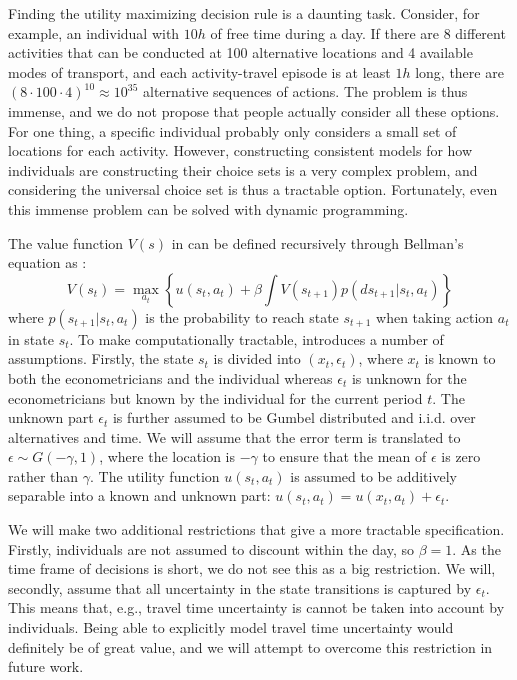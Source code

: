 Finding the utility maximizing decision rule is a daunting task. Consider, for example, an individual with $10\unit{h}$ of free time during a day. If there are 8 different activities that can be conducted at 100 alternative locations and 4 available modes of transport, and each activity-travel episode is at least $1\unit{h}$ long, there are $(8 \cdot100 \cdot 4)^{10} \approx 10^{35}$ alternative sequences of actions. The problem is thus immense, and we do not propose that people actually consider all these options. For one thing, a specific individual probably only considers a small set of locations for each activity. However, constructing consistent models for how individuals are constructing their choice sets is a very complex problem, and considering the universal choice set is thus a tractable option. Fortunately, even this immense problem can be solved with dynamic programming. 

The value function $V(s)$ in  can be defined recursively through Bellman's equation as \citep{Rust87}:
\begin{equation} \label{eq:vfbellman}
V(s_t) = \max_{a_t} \left\{u(s_t,a_t) + \beta \int V(s_{t+1})p(ds_{t+1}|s_t,a_t) \right\}
\end{equation}
where $p(s_{t+1}|s_t,a_t)$ is the probability to reach state $s_{t+1}$ when taking action $a_t$ in state $s_t$. 
 To make  computationally tractable, \citet{Rust87} introduces a number of assumptions. Firstly, the state $s_t$ is divided into $(x_t,\epsilon_t)$, where $x_t$ is known to both the econometricians and the individual whereas $\epsilon_t$ is unknown for the econometricians but known by the individual for the current period $t$. The unknown part $\epsilon_t$ is further assumed to be Gumbel distributed and i.i.d. over alternatives and time. We will assume that the error term is translated to $\epsilon \sim G(-\gamma,1)$, where the location is $-\gamma$ to ensure that the mean of $\epsilon$ is zero rather than $\gamma$. The utility function $u(s_t,a_t)$ is assumed to be additively separable into a known and unknown part: $u(s_t,a_t) = u(x_t,a_t) + \epsilon_t$. 
  

We will make two additional restrictions that give a more tractable specification. Firstly, individuals are not assumed to discount within the day, so $\beta=1$. As the time frame of decisions is short, we do not see this as a big restriction. We will, secondly, assume that all uncertainty in the state transitions is captured by $\epsilon_t$. This means that, e.g., travel time uncertainty is cannot be taken into account by individuals. Being able to explicitly model travel time uncertainty would definitely be of great value, and we will attempt to overcome this restriction in future work. 

